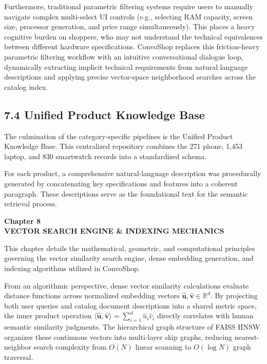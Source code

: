 \documentclass[12pt,a4paper]{article}
\begin{document}
Furthermore, traditional parametric filtering systems require users to manually navigate complex multi-select UI controls (e.g., selecting RAM capacity, screen size, processor generation, and price range simultaneously). This places a heavy cognitive burden on shoppers, who may not understand the technical equivalences between different hardware specifications. ConvoShop replaces this friction-heavy parametric filtering workflow with an intuitive conversational dialogue loop, dynamically extracting implicit technical requirements from natural language descriptions and applying precise vector-space neighborhood searches across the catalog index.

\subsection*{7.4 Unified Product Knowledge Base}
\label{sec:7.4}
The culmination of the category-specific pipelines is the Unified Product Knowledge Base. This centralized repository combines the 271 phone, 1,453 laptop, and 830 smartwatch records into a standardized schema.

For each product, a comprehensive natural-language description was procedurally generated by concatenating key specifications and features into a coherent paragraph. These descriptions serve as the foundational text for the semantic retrieval process.

\newpage

\label{chap:8}
\begin{center}
{\fontsize{14}{17}\bfseries Chapter 8\\[6pt]}
{\fontsize{16}{20}\bfseries VECTOR SEARCH ENGINE \& INDEXING MECHANICS\\[10pt]}
\end{center}

This chapter details the mathematical, geometric, and computational principles governing the vector similarity search engine, dense embedding generation, and indexing algorithms utilized in ConvoShop.



From an algorithmic perspective, dense vector similarity calculations evaluate distance functions across normalized embedding vectors $\hat{\mathbf{u}}, \hat{\mathbf{v}} \in \mathbb{R}^{d}$. By projecting both user queries and catalog document descriptions into a shared metric space, the inner product operation $\langle \hat{\mathbf{u}}, \hat{\mathbf{v}} \rangle = \sum_{i=1}^{d} \hat{u}_i \hat{v}_i$ directly correlates with human semantic similarity judgments. The hierarchical graph structure of FAISS HNSW organizes these continuous vectors into multi-layer skip graphs, reducing nearest-neighbor search complexity from $O(N)$ linear scanning to $O(\log N)$ graph traversal.
\end{document}
